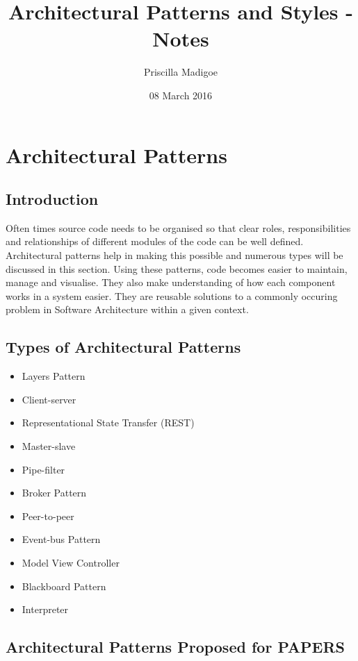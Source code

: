 \documentclass[a4paper,12pt]{article}
\begin{document}
\title{Architectural Patterns and Styles - Notes}
\author{Priscilla Madigoe}
\date{08 March 2016}
\maketitle
 
\section{Architectural Patterns}

\subsection{Introduction}
Often times source code needs to be organised so that clear roles, responsibilities and relationships of different modules of the code can be well defined. Architectural patterns help in making this possible and numerous types will be discussed in this section. Using these patterns, code becomes easier to maintain, manage and visualise. They also make understanding of how each component works in a system easier. They are reusable solutions to a commonly occuring problem in Software Architecture within a given context.

\subsection{Types of Architectural Patterns}

\begin{itemize}
\item Layers Pattern
\item Client-server
\item Representational State Transfer (REST)
\item Master-slave
\item Pipe-filter
\item Broker Pattern
\item Peer-to-peer
\item Event-bus Pattern
\item Model View Controller
\item Blackboard Pattern
\item Interpreter
\end{itemize}

\subsection{Architectural Patterns Proposed for PAPERS}
\end{document}
